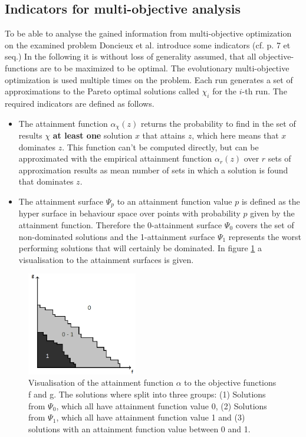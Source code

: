 \documentclass[12pt,twoside]{article}
\theoremstyle{plain}
\theoremstyle{definition}
\theoremstyle{remark}
\begin{document}
\subsection{Indicators for multi-objective analysis}
\label{back:indicators}
To be able to analyse the gained information from multi-objective optimization on the examined problem Doncieux et al. introduce some indicators (cf. \cite{doncieux2015multi} p. 7 et seq.)
In the following it is without loss of generality assumed, that all objective-functions are to be maximized to be optimal.
The evolutionary multi-objective optimization is used multiple times on the problem. Each run generates a set of approximations to the Pareto optimal solutions called $\chi_i$ for the $i$-th run.
The required indicators are defined as follows.
\begin{itemize}
	\item The attainment function $\alpha_\chi(z)$ returns the probability to find in the set of results $\chi$ \textbf{at least one} solution $x$ that attains $z$, which here means that $x$ dominates $z$. This function can't be computed directly, but can be approximated with the empirical attainment function $\alpha_r(z)$ over $r$ sets of approximation results as mean number of sets in which a solution is found that dominates $z$.
	\item The attainment surface $\Psi_p$ to an attainment function value $p$ is defined as the hyper surface in behaviour space over points with probability $p$ given by the attainment function.
	Therefore the 0-attainment surface $\Psi_0$ covers the set of non-dominated solutions and the 1-attainment surface $\Psi_1$ represents the worst performing solutions that will certainly be dominated.
	In figure \ref{fig:attainment1} a visualisation to the attainment surfaces is given.
\end{itemize}
\begin{figure}[h!]
	\vspace*{-0.65cm}
	\begin{center}
		\includegraphics[width=0.43\textwidth]{Bilder/attainment_surfaces.png}
	\end{center}
	\vspace*{-0.9cm}
	\caption{Visualisation of the attainment function $\alpha$ to the objective functions f and g. The solutions where split into three groups: (1) Solutions from $\Psi_0$, which all have attainment function value 0, (2) Solutions from $\Psi_1$, which all have attainment function value 1 and (3) solutions with an attainment function value between 0 and 1.} 
	\label{fig:attainment1}
\end{figure}
\end{document}
